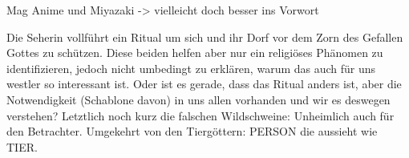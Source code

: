 Mag Anime und Miyazaki -> vielleicht doch besser ins Vorwort

Die Seherin vollführt ein Ritual um sich und ihr Dorf vor dem Zorn des Gefallen Gottes zu schützen. Diese beiden helfen aber nur ein religiöses Phänomen zu identifizieren, jedoch nicht umbedingt zu erklären, warum das auch für uns westler so interessant ist. Oder ist es gerade, dass das Ritual anders ist, aber die Notwendigkeit (Schablone davon) in uns allen vorhanden und wir es deswegen verstehen? Letztlich noch kurz die falschen Wildschweine: Unheimlich auch für den Betrachter. Umgekehrt von den Tiergöttern: PERSON die aussieht wie TIER.